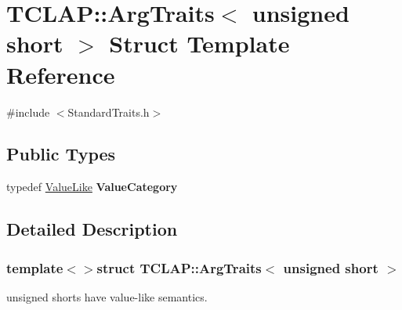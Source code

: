 \hypertarget{struct_t_c_l_a_p_1_1_arg_traits_3_01unsigned_01short_01_4}{\section{T\+C\+L\+A\+P\+:\+:Arg\+Traits$<$ unsigned short $>$ Struct Template Reference}
\label{struct_t_c_l_a_p_1_1_arg_traits_3_01unsigned_01short_01_4}
}


{\ttfamily \#include $<$Standard\+Traits.\+h$>$}

\subsection*{Public Types}
\begin{DoxyCompactItemize}
\item 
\hypertarget{struct_t_c_l_a_p_1_1_arg_traits_3_01unsigned_01short_01_4_a0efa2ce53e9cb98dc4a58dda24127d3a}{typedef \hyperlink{struct_t_c_l_a_p_1_1_value_like}{Value\+Like} {\bfseries Value\+Category}}\label{struct_t_c_l_a_p_1_1_arg_traits_3_01unsigned_01short_01_4_a0efa2ce53e9cb98dc4a58dda24127d3a}

\end{DoxyCompactItemize}


\subsection{Detailed Description}
\subsubsection*{template$<$$>$struct T\+C\+L\+A\+P\+::\+Arg\+Traits$<$ unsigned short $>$}

unsigned shorts have value-\/like semantics. 